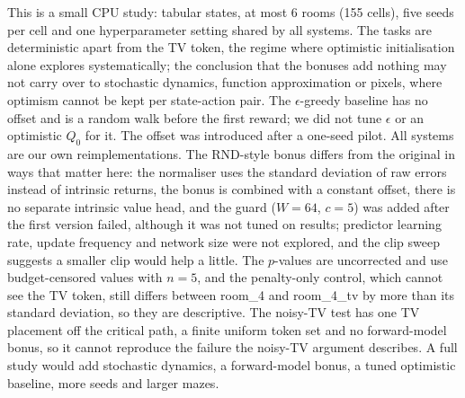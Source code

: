 This is a small CPU study: tabular states, at most 6 rooms (155 cells), five seeds per cell and one hyperparameter setting shared by all systems. The tasks are deterministic apart from the TV token, the regime where optimistic initialisation alone explores systematically; the conclusion that the bonuses add nothing may not carry over to stochastic dynamics, function approximation or pixels, where optimism cannot be kept per state-action pair. The $\epsilon$-greedy baseline has no offset and is a random walk before the first reward; we did not tune $\epsilon$ or an optimistic $Q_0$ for it. The offset was introduced after a one-seed pilot. All systems are our own reimplementations. The RND-style bonus differs from the original in ways that matter here: the normaliser uses the standard deviation of raw errors instead of intrinsic returns, the bonus is combined with a constant offset, there is no separate intrinsic value head, and the guard ($W=64$, $c=5$) was added after the first version failed, although it was not tuned on results; predictor learning rate, update frequency and network size were not explored, and the clip sweep suggests a smaller clip would help a little. The $p$-values are uncorrected and use budget-censored values with $n=5$, and the penalty-only control, which cannot see the TV token, still differs between room\_4 and room\_4\_tv by more than its standard deviation, so they are descriptive. The noisy-TV test has one TV placement off the critical path, a finite uniform token set and no forward-model bonus, so it cannot reproduce the failure the noisy-TV argument describes. A full study would add stochastic dynamics, a forward-model bonus, a tuned optimistic baseline, more seeds and larger mazes.
